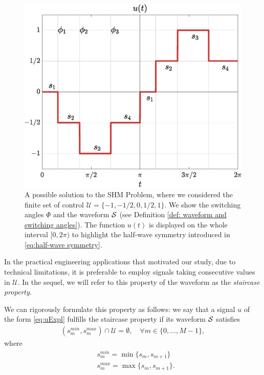 \documentclass[twocolumn]{autart}    %
\begin{document}
\begin{figure}[h]
	\centering
	\includegraphics[scale=0.35]{img/fig01.eps} 
	\caption{A possible solution to the SHM Problem, where we considered the finite set of control $\mathcal{U} = \{-1, -1/2, 0, 1/2, 1\}$. We show the switching angles $\Phi$ and the waveform $\mathcal{S}$ (see Definition \ref{def: waveform and switching angles}). The function $u(t)$ is displayed on the whole interval $[0,2\pi)$ to highlight the half-wave symmetry introduced in \eqref{eq:half-wave symmetry}.}
	\label{fig:exampleSHE}
\end{figure}

In the practical engineering applications that motivated our study, due to technical limitations, it is preferable to employ signals taking consecutive values in $\mathcal{U}$. In the sequel, we will refer to this property of the waveform as the \emph{staircase property}.

We can rigorously formulate this property as follows: we say that a signal $u$ of the form \eqref{eq:uExpl} fulfills the staircase property if its waveform $\mathcal{S}$ satisfies
\begin{gather}\label{eq:staircase prop}
	(s_m^{min},s_{m}^{max}) \cap \mathcal{U} = \emptyset, \quad \forall m\in \{ 0, \ldots, M-1 \},
\end{gather}
where 
\begin{align*}
	&s^{min}_m = \min\{s_m,s_{m+1}\} 
	\\[5pt]
	&s^{max}_m = \max\{s_m,s_{m+1}\}.
\end{align*}
\end{document}
